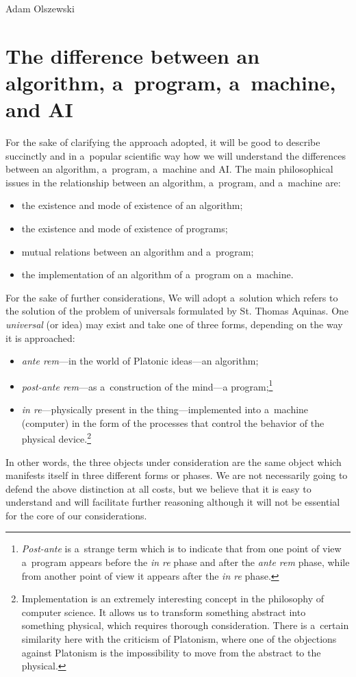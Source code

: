\begin{artengenv}{Adam Olszewski}
\section{The difference between an algorithm, a~program, a~machine, and AI}
For the sake of clarifying the approach adopted, it will be good to describe succinctly and in a~popular scientific way how we will understand the differences between an algorithm, a~program, a~machine and AI. The main philosophical issues in the relationship between an algorithm, a~program, and a~machine are:

\begin{itemize}
\item the existence and mode of existence of an algorithm;
\item the existence and mode of existence of programs;
\item mutual relations between an algorithm and a~program;
\item the implementation of an algorithm of a~program on a~machine.
\end{itemize}
For the sake of further considerations, We will adopt a~solution which refers to the solution of the problem of universals formulated by St. Thomas Aquinas. One \textit{universal} (or idea) may exist and take one of three forms, depending on the way it is approached:

\begin{itemize}
\item \textit{ante rem}—in the world of Platonic ideas—an algorithm;
\item \textit{post-ante rem}—as a~construction of the mind—a program;\footnote{\textit{Post-ante} is a~strange term which is to indicate that from one point of view a~program appears before the \textit{in re} phase and after the \textit{ante rem} phase, while from another point of view it appears after the \textit{in re} phase.}
\item \textit{in re}—physically present in the thing—implemented into a~machine (computer) in the form of the processes that control the behavior of the physical device.\footnote{Implementation is an extremely interesting concept in the philosophy of computer science. It allows us to transform something abstract into something physical, which requires thorough consideration. There is a~certain similarity here with the criticism of Platonism, where one of the objections against Platonism is the impossibility to move from the abstract to the physical.}
\end{itemize}
In other words, the three objects under consideration are the same object which manifests itself in three different forms or phases. We are not necessarily going to defend the above distinction at all costs, but we believe that it is easy to understand and will facilitate further reasoning although it will not be essential for the core of our considerations.


\end{artengenv}
